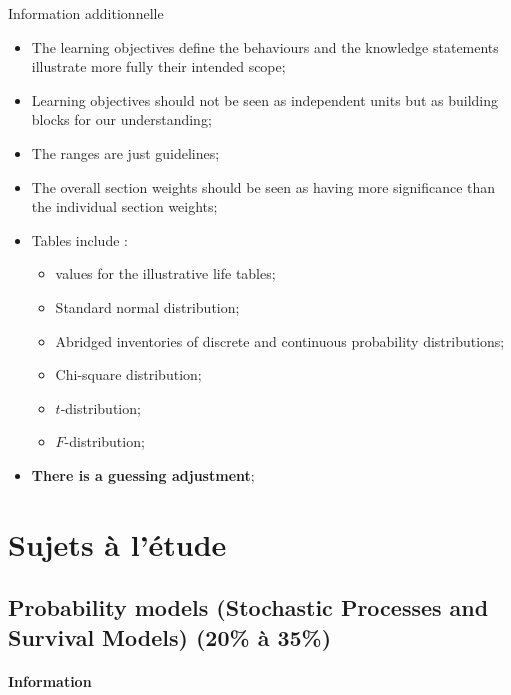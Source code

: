\documentclass[12pt, titlepage, french]{report}
\begin{document}
\begin{CHPT_SUMM}{Information additionnelle}
	\begin{itemize}
		\item	The learning objectives define the behaviours and the knowledge statements illustrate more fully their intended scope;
		\item	Learning objectives should not be seen as independent units but as building blocks for our understanding;
		\item	The ranges are just guidelines;
		\item	The overall section weights should be seen as having more significance than the individual section weights;
		\item	Tables include :
			\begin{itemize}
			\item	values for the illustrative life tables;
			\item	Standard normal distribution;
			\item	Abridged inventories of discrete and continuous probability distributions;
			\item	Chi-square distribution;
			\item	$t$-distribution;
			\item	$F$-distribution;
			\end{itemize}
		\item	\textbf{There is a guessing adjustment};
	\end{itemize}
\end{CHPT_SUMM}

\part*{Sujets à l'étude}

\chapter[Probability models (Stochastic Processes and Survival Models)]{Probability models (Stochastic Processes and Survival Models) (20\% à 35\%)}

\subsection{Information}
\end{document}
